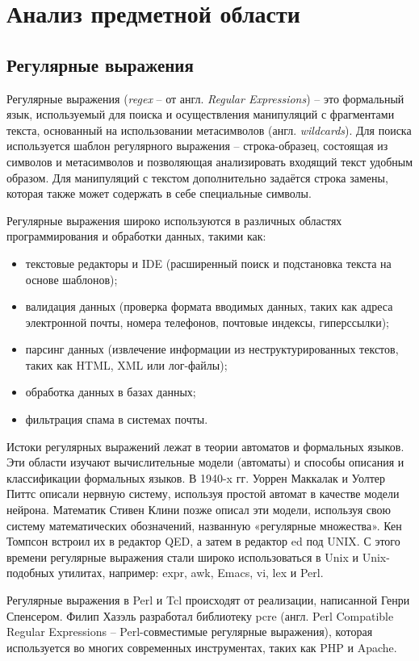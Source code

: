 \section{Анализ предметной области}
\subsection{Регулярные выражения}

Регулярные выражения (\textit{regex} -- от англ. \textit{Regular Expressions}) -- это формальный язык, используемый для поиска и осуществления манипуляций с фрагментами текста, основанный на использовании метасимволов (англ. \textit{wildcards}). Для поиска используется шаблон регулярного выражения -- строка-образец, состоящая из символов и метасимволов и позволяющая анализировать входящий текст удобным образом. Для манипуляций с текстом дополнительно задаётся строка замены, которая также может содержать в себе специальные символы.

Регулярные выражения широко используются в различных областях программирования и обработки данных, такими как:
\begin{itemize}
	\item текстовые редакторы и IDE (расширенный поиск и подстановка текста на основе шаблонов);
	\item валидация данных (проверка формата вводимых данных, таких как адреса электронной почты, номера телефонов, почтовые индексы, гиперссылки);
	\item парсинг данных (извлечение информации из неструктурированных текстов, таких как HTML, XML или лог-файлы);
	\item обработка данных в базах данных;
	\item фильтрация спама в системах почты.
\end{itemize}

Истоки регулярных выражений лежат в теории автоматов и формальных языков. Эти области изучают вычислительные модели (автоматы) и способы описания и классификации формальных языков. В 1940-x гг. Уоррен Маккалак и Уолтер Питтс описали нервную систему, используя простой автомат в качестве модели нейрона. Математик Стивен Клини позже описал эти модели, используя свою систему математических обозначений, названную «регулярные множества». Кен Томпсон встроил их в редактор QED, а затем в редактор ed под UNIX. С этого времени регулярные выражения стали широко использоваться в Unix и Unix-подобных утилитах, например: expr, awk, Emacs, vi, lex и Perl.

Регулярные выражения в Perl и Tcl происходят от реализации, написанной Генри Спенсером. Филип Хазэль разработал библиотеку pcre (англ. Perl Compatible Regular Expressions -- Perl-совместимые регулярные выражения), которая используется во многих современных инструментах, таких как PHP и Apache. 

